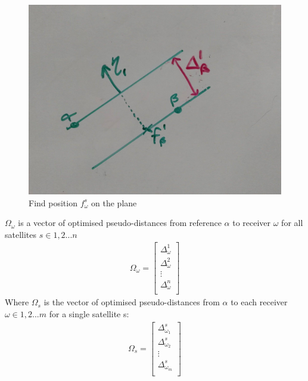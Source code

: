 \documentclass[11pt,a4paper]{article}
\begin{document}
\begin{figure}[h]
\centering
\caption{Find position $f_\omega^s$ on the plane}
\label{fig:pointonplane}
\includegraphics[width=0.7\linewidth]{pointonplane}
\end{figure}






$\Omega_\omega$ is a vector of optimised pseudo-distances from reference $\alpha$ to receiver $\omega$ for all satellites $s\in{1,2...n}$
\begin{eqnarray}
\Omega_\omega = \begin{bmatrix}
\Delta_{\omega}^1 \\
\Delta_{\omega}^2 \\
\vdots\\
\Delta_{\omega}^n \\
\end{bmatrix}
\end{eqnarray}
Where $\Omega_s$ is the vector of optimised pseudo-distances from $\alpha$ to each receiver $\omega\in1,2...m$ for a single satellite s:
\begin{eqnarray}
\Omega_s = \begin{bmatrix}
\Delta_{\omega_1}^s \\
\Delta_{\omega_2}^s \\
\vdots\\
\Delta_{\omega_m}^s \\
\end{bmatrix}
\end{eqnarray}
\end{document}
